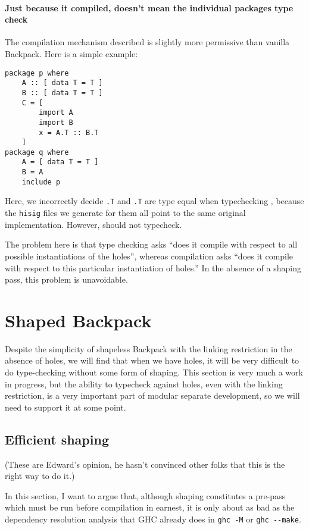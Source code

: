 \documentclass{article}
\begin{document}
\paragraph{Just because it compiled, doesn't mean the individual packages type check}
The compilation mechanism described is slightly more permissive than vanilla Backpack.
Here is a simple example:

\begin{verbatim}
package p where
    A :: [ data T = T ]
    B :: [ data T = T ]
    C = [
        import A
        import B
        x = A.T :: B.T
    ]
package q where
    A = [ data T = T ]
    B = A
    include p
\end{verbatim}

Here, we incorrectly decide \verb|.T| and \verb|.T| are type
equal when typechecking , because the \verb|hisig| files we
generate for them all point to the same original implementation.  However,
 should not typecheck.

The problem here is that type checking asks ``does it compile with respect
to all possible instantiations of the holes'', whereas compilation asks
``does it compile with respect to this particular instantiation of holes.''
In the absence of a shaping pass, this problem is unavoidable.

\section{Shaped Backpack}

Despite the simplicity of shapeless Backpack with the linking
restriction in the absence of holes, we will find that when we have
holes, it will be very difficult to do type-checking without
some form of shaping.  This section is very much a work in progress,
but the ability to typecheck against holes, even with the linking restriction,
is a very important part of modular separate development, so we will need
to support it at some point.

\subsection{Efficient shaping}

(These are Edward's opinion, he hasn't convinced other folks that this is
the right way to do it.)

In this section, I want to argue that, although shaping constitutes
a pre-pass which must be run before compilation in earnest, it is only
about as bad as the dependency resolution analysis that GHC already does
in \verb|ghc -M| or \verb|ghc --make|.
\end{document}
